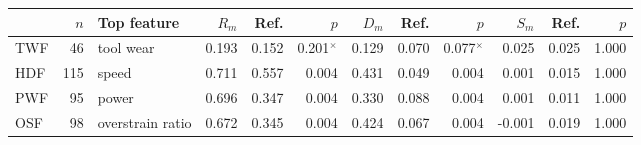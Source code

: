 \begin{tabular}{@{}lrlrrrrrrrrr@{}}
\toprule
& $n$ & Top feature & $R_m$ & Ref. & $p$ & $D_m$ & Ref. & $p$ & $S_m$ & Ref. & $p$ \\
\midrule
TWF & 46 & tool wear & 0.193 & 0.152 & 0.201$^{\times}$ & 0.129 & 0.070 & 0.077$^{\times}$ & 0.025 & 0.025 & 1.000 \\
HDF & 115 & speed & 0.711 & 0.557 & 0.004 & 0.431 & 0.049 & 0.004 & 0.001 & 0.015 & 1.000 \\
PWF & 95 & power & 0.696 & 0.347 & 0.004 & 0.330 & 0.088 & 0.004 & 0.001 & 0.011 & 1.000 \\
OSF & 98 & overstrain ratio & 0.672 & 0.345 & 0.004 & 0.424 & 0.067 & 0.004 & -0.001 & 0.019 & 1.000 \\
\bottomrule
\end{tabular}
